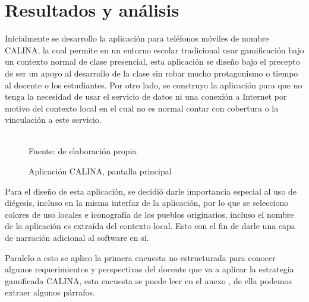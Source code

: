 %

\section{Resultados y análisis}

Inicialmente se desarrollo la aplicación para teléfonos móviles de nombre CALINA, la cual permite en un 
entorno escolar tradicional usar gamificación bajo un contexto normal de clase presencial, esta aplicación 
se diseño bajo el precepto de ser un apoyo al desarrollo de la clase sin robar mucho protagonismo o tiempo al 
docente o los estudiantes.  Por otro lado, se construyo la aplicación para que no tenga la necesidad de usar 
el servicio de datos ni una conexión a Internet por motivo del contexto local en el cual no es normal contar 
con cobertura o la vinculación a este servicio.

\begin{figure}[!htb]
\caption[Aplicación CALINA, pantalla principal]{Aplicación CALINA, pantalla principal}
\centering
\begin{adjustbox}{width=6cm}
\end{adjustbox}
\\
{\footnotesize Fuente: de elaboración propia}
\end{figure}

Para el diseño de esta aplicación, se decidió darle importancia especial al uso de diégesis, incluso en la 
misma interfaz de la aplicación, por lo que se selecciono colores de uso locales e iconografía de los pueblos 
originarios, incluso el nombre de la aplicación es extraída del contexto local. Esto con el fin de darle una 
capa de narración adicional al software en sí.

Paralelo a esto se aplico la primera encuesta no estructurada para conocer algunos requerimientos y 
perspectivas del docente que va a aplicar la estrategia gamificada CALINA, esta encuesta se puede leer en el 
anexo \label{anexo:encuestas}, de ella podemos extraer algunos párrafos.

\makeatletter
\newcommand*{\singlespacingNoVspace}{%
  \setstretch{\setspace@singlespace}}
\makeatother

